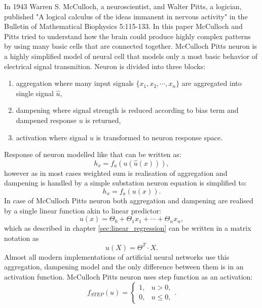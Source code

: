 In 1943 Warren S. McCulloch, a neuroscientist, and Walter Pitts, a logician, 
published "A logical calculus of the ideas immanent in nervous activity" in the 
Bulletin of Mathematical Biophysics 5:115-133. In this paper McCulloch and Pitts tried to
understand how the brain could produce highly complex patterns by using many basic cells
that are connected together. 
McCulloch Pitts neuron is a highly simplified model of neural cell that models only a most
basic behavior of electrical signal transmition.
Neuron is divided into three blocks:
\begin{enumerate}
	\item aggregation where many input signals $\{x_{1}, x_{2}, \cdots, x_{n}\}$ are 
		aggregated into single signal $\hat{u}$,
	\item dampening where signal strength is reduced according to bias term and dampened 
		response $u$ is returned,
	\item activation where signal $u$ is transformed to neuron response space.
\end{enumerate}
Response of neuron modelled like that can be written as:
\begin{equation}
	\label{equ:neuron_response}
	h_{x} = f_{a}(u(\hat{u}(x))),
\end{equation}
however as in most cases weighted sum is realisation of aggregation and dampening is handled by
a simple substation neuron equation is simplified to: 
\begin{equation}
	\label{equ:neuron_response}
	h_{x} = f_{a}(u(x)).
\end{equation}
In case of McCulloch Pitts neuron both aggregation and dampening are realised by a single 
linear function akin to linear predictor:
\begin{equation}
	\label{equ:linear_neuron}
	u(x) = \Theta_{0} + \Theta_{1}x_{1} + \cdots + \Theta_{n}x_{n},
\end{equation}
which as described in chapter \ref{sec:linear_regression} can be written in a matrix notation as
\begin{equation}
	\label{equ:linear_neuron_matrix}
	u(X) = \Theta^{T}\cdot X.
\end{equation}
Almost all modern implementations of artificial neural networks use this aggregation, dampening
model and the only difference between them is in an activation function.
McCulloch Pitts neuron uses step function as an activation:
\[
	\label{equ:step_function}
	 f_{STEP}(u)=
	\begin{cases}
		1,&  u > 0, \\
		0,&  u \leq 0,
	\end{cases}
	.
\]

